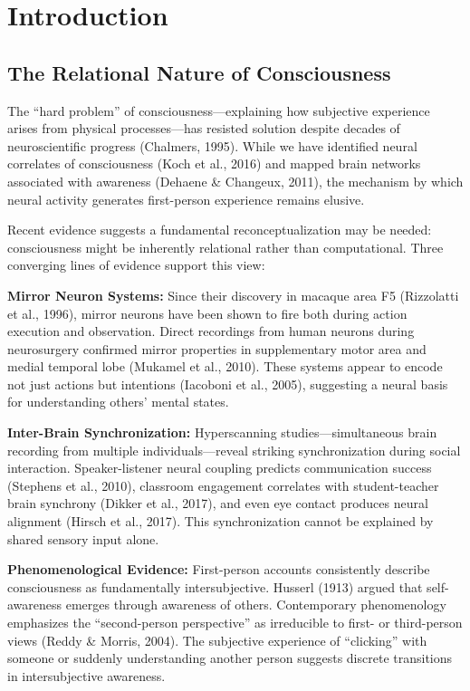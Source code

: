 \documentclass[12pt]{article}
\begin{document}
\section{Introduction}

\subsection{The Relational Nature of Consciousness}

The ``hard problem'' of consciousness—explaining how subjective experience arises from physical processes—has resisted solution despite decades of neuroscientific progress (Chalmers, 1995). While we have identified neural correlates of consciousness (Koch et al., 2016) and mapped brain networks associated with awareness (Dehaene \& Changeux, 2011), the mechanism by which neural activity generates first-person experience remains elusive.

Recent evidence suggests a fundamental reconceptualization may be needed: consciousness might be inherently relational rather than computational. Three converging lines of evidence support this view:

\textbf{Mirror Neuron Systems:} Since their discovery in macaque area F5 (Rizzolatti et al., 1996), mirror neurons have been shown to fire both during action execution and observation. Direct recordings from human neurons during neurosurgery confirmed mirror properties in supplementary motor area and medial temporal lobe (Mukamel et al., 2010). These systems appear to encode not just actions but intentions (Iacoboni et al., 2005), suggesting a neural basis for understanding others' mental states.

\textbf{Inter-Brain Synchronization:} Hyperscanning studies—simultaneous brain recording from multiple individuals—reveal striking synchronization during social interaction. Speaker-listener neural coupling predicts communication success (Stephens et al., 2010), classroom engagement correlates with student-teacher brain synchrony (Dikker et al., 2017), and even eye contact produces neural alignment (Hirsch et al., 2017). This synchronization cannot be explained by shared sensory input alone.

\textbf{Phenomenological Evidence:} First-person accounts consistently describe consciousness as fundamentally intersubjective. Husserl (1913) argued that self-awareness emerges through awareness of others. Contemporary phenomenology emphasizes the ``second-person perspective'' as irreducible to first- or third-person views (Reddy \& Morris, 2004). The subjective experience of ``clicking'' with someone or suddenly understanding another person suggests discrete transitions in intersubjective awareness.
\end{document}
